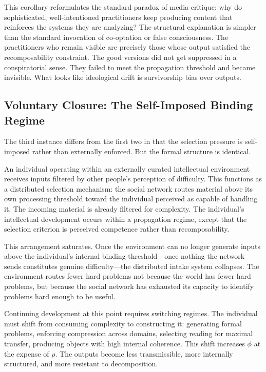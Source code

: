 \documentclass[12pt]{article}
\newcommand{\bind}{\phi}
\newcommand{\recomp}{\rho}
\begin{document}
This corollary reformulates the standard paradox of media critique: why
do sophisticated, well-intentioned practitioners keep producing content
that reinforces the systems they are analyzing? The structural
explanation is simpler than the standard invocation of co-optation or
false consciousness. The practitioners who remain visible are precisely
those whose output satisfied the recomposability constraint. The good
versions did not get suppressed in a conspiratorial sense. They failed
to meet the propagation threshold and became invisible. What looks like
ideological drift is survivorship bias over outputs.

\subsection{Voluntary Closure: The Self-Imposed Binding Regime}
\label{ssec:voluntary}

The third instance differs from the first two in that the selection
pressure is self-imposed rather than externally enforced. But the formal
structure is identical.

An individual operating within an externally curated intellectual
environment receives inputs filtered by other people's perception of
difficulty. This functions as a distributed selection mechanism: the
social network routes material above its own processing threshold toward
the individual perceived as capable of handling it. The incoming
material is already filtered for complexity. The individual's
intellectual development occurs within a propagation regime, except that
the selection criterion is perceived competence rather than
recomposability.

This arrangement saturates. Once the environment can no longer generate
inputs above the individual's internal binding threshold---once nothing
the network sends constitutes genuine difficulty---the distributed
intake system collapses. The environment routes fewer hard problems not
because the world has fewer hard problems, but because the social
network has exhausted its capacity to identify problems hard enough to
be useful.

Continuing development at this point requires switching regimes. The
individual must shift from consuming complexity to constructing it:
generating formal problems, enforcing compression across domains,
selecting reading for maximal transfer, producing objects with high
internal coherence. This shift increases $\bind$ at the expense of
$\recomp$. The outputs become less transmissible, more internally
structured, and more resistant to decomposition.
\end{document}

